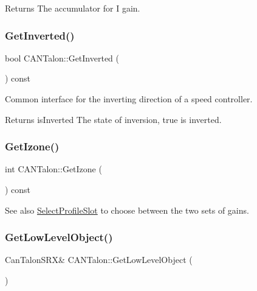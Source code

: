 \begin{DoxyReturn}{Returns}
The accumulator for I gain. 
\end{DoxyReturn}
\mbox{\label{class_c_a_n_talon_aa85609e0aadcd710012b912591bd65d8}} 
\subsubsection{\texorpdfstring{Get\+Inverted()}{GetInverted()}}
{\footnotesize\ttfamily bool C\+A\+N\+Talon\+::\+Get\+Inverted (\begin{DoxyParamCaption}{ }\end{DoxyParamCaption}) const\hspace{0.3cm}{\ttfamily [override]}}

Common interface for the inverting direction of a speed controller.

\begin{DoxyReturn}{Returns}
is\+Inverted The state of inversion, true is inverted. 
\end{DoxyReturn}
\mbox{\label{class_c_a_n_talon_a492373ce8d2553d185ed56f2627e9f4c}} 
\subsubsection{\texorpdfstring{Get\+Izone()}{GetIzone()}}
{\footnotesize\ttfamily int C\+A\+N\+Talon\+::\+Get\+Izone (\begin{DoxyParamCaption}{ }\end{DoxyParamCaption}) const}

\begin{DoxySeeAlso}{See also}
\hyperlink{class_c_a_n_talon_a0f478462884ed5e541179821c44b724f}{Select\+Profile\+Slot} to choose between the two sets of gains. 
\end{DoxySeeAlso}
\mbox{\label{class_c_a_n_talon_ad8a7985b0adfe2a10a379254efe28193}} 
\subsubsection{\texorpdfstring{Get\+Low\+Level\+Object()}{GetLowLevelObject()}}
{\footnotesize\ttfamily Can\+Talon\+S\+RX\& C\+A\+N\+Talon\+::\+Get\+Low\+Level\+Object (\begin{DoxyParamCaption}{ }\end{DoxyParamCaption})\hspace{0.3cm}{\ttfamily [inline]}}

